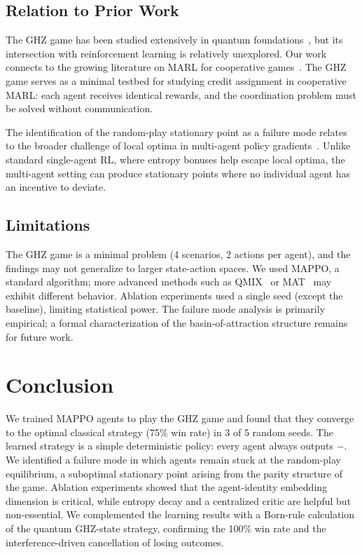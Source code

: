 \documentclass[journal]{IEEEtran}
\begin{document}
\subsection{Relation to Prior Work}

The GHZ game has been studied extensively in quantum foundations~\cite{ghz1989,mermin1990mysteries,mermin1990extreme,brassard2003}, but its intersection with reinforcement learning is relatively unexplored. Our work connects to the growing literature on MARL for cooperative games~\cite{yu2022mappo,lowe2017maddpg,rashid2018qmix,sunehag2018vdn}. The GHZ game serves as a minimal testbed for studying credit assignment in cooperative MARL: each agent receives identical rewards, and the coordination problem must be solved without communication.

The identification of the random-play stationary point as a failure mode relates to the broader challenge of local optima in multi-agent policy gradients~\cite{lowe2017maddpg,foerster2018coma}. Unlike standard single-agent RL, where entropy bonuses help escape local optima, the multi-agent setting can produce stationary points where no individual agent has an incentive to deviate.

\subsection{Limitations}

The GHZ game is a minimal problem (4 scenarios, 2 actions per agent), and the findings may not generalize to larger state-action spaces. We used MAPPO, a standard algorithm; more advanced methods such as QMIX~\cite{rashid2018qmix} or MAT~\cite{wen2022mat} may exhibit different behavior. Ablation experiments used a single seed (except the baseline), limiting statistical power. The failure mode analysis is primarily empirical; a formal characterization of the basin-of-attraction structure remains for future work.

\section{Conclusion}

We trained MAPPO agents to play the GHZ game and found that they converge to the optimal classical strategy (75\% win rate) in 3 of 5 random seeds. The learned strategy is a simple deterministic policy: every agent always outputs $-$. We identified a failure mode in which agents remain stuck at the random-play equilibrium, a suboptimal stationary point arising from the parity structure of the game. Ablation experiments showed that the agent-identity embedding dimension is critical, while entropy decay and a centralized critic are helpful but non-essential. We complemented the learning results with a Born-rule calculation of the quantum GHZ-state strategy, confirming the 100\% win rate and the interference-driven cancellation of losing outcomes.
\end{document}
